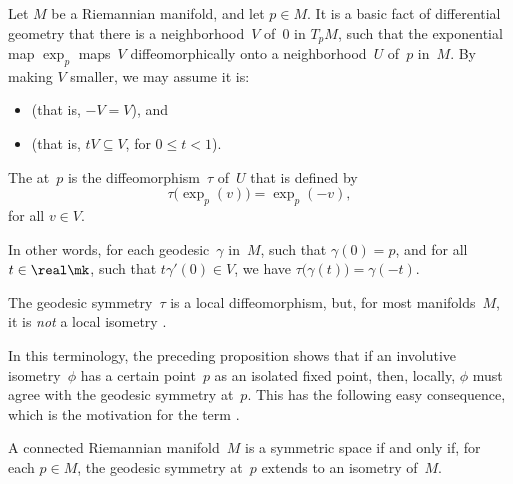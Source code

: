 \begin{defn}
 Let $M$ be a Riemannian manifold, and let $p \in M$. 
It is a basic fact of differential geometry that there is a neighborhood~$V$ of~$0$ in $T_pM$, such that the exponential map $\exp_p$ maps~$V$ diffeomorphically onto a
neighborhood~$U$ of~$p$ in~$M$. By making $V$ smaller, we may assume it is:
	\begin{itemize}
	\item {} (that is, $-V = V$),
	and
	\item {} (that is, $tV \subseteq V$, for $0\le t < 1$).
	\end{itemize}
The  at~$p$ is the diffeomorphism~$\tau$ of~$U$ that is defined by
 $$ \tau \bigl( \exp_p(v) \bigr) = \exp_p(-v) ,$$
 for all $v \in V$.

In other words, for each geodesic~$\gamma$ in~$M$, such that
$\gamma(0) = p$, and for all $t \in \real\mk$, such that $t \gamma'(0)
\in V$, we have $\tau \bigl( \gamma(t) \bigr) = \gamma(-t)$.
 \end{defn}

\begin{note}
 The geodesic symmetry~$\tau$ is a local diffeomorphism, but, for
most manifolds~$M$, it is \emph{not} a local isometry
.
 \end{note}

In this terminology, the preceding proposition shows that if an
involutive isometry~$\phi$ has a certain point~$p$ as an isolated
fixed point, then, locally, $\phi$ must agree with the geodesic
symmetry at~$p$. This has the following easy consequence, which is
the motivation for the term .

\begin{cor} \label{symm<>geodsymm}
 A connected Riemannian manifold~$M$ is a symmetric space if and only
if, for each $p \in M$, the geodesic symmetry at~$p$ extends to an
isometry of~$M$.
 \end{cor}


